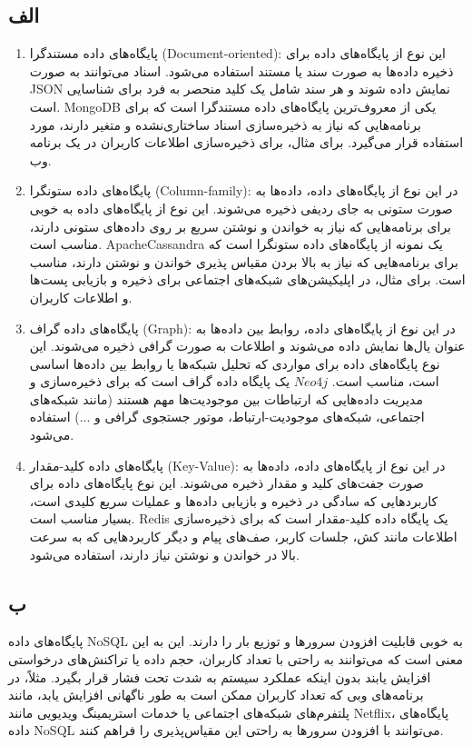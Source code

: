 \subsection*{الف}
\begin{enumerate}
	\item پایگاه‌های داده مستندگرا (Document-oriented):
	این نوع از پایگاه‌های داده برای ذخیره داده‌ها به صورت سند یا مستند استفاده می‌شود. اسناد می‌توانند به صورت JSON نمایش داده شوند و هر سند شامل یک کلید منحصر به فرد برای شناسایی است.
	MongoDB یکی از معروف‌ترین پایگاه‌های داده مستندگرا است که برای برنامه‌هایی که نیاز به ذخیره‌سازی اسناد ساختاری‌نشده و متغیر دارند، مورد استفاده قرار می‌گیرد. برای مثال، برای ذخیره‌سازی اطلاعات کاربران در یک برنامه وب.
	\item پایگاه‌های داده ستونگرا (Column-family):
	در این نوع از پایگاه‌های داده، داده‌ها به صورت ستونی به جای ردیفی ذخیره می‌شوند. این نوع از پایگاه‌های داده به خوبی برای برنامه‌هایی که نیاز به خواندن و نوشتن سریع بر روی داده‌های ستونی دارند، مناسب است. ApacheCassandra  یک نمونه از پایگاه‌های داده ستونگرا است که برای برنامه‌هایی که نیاز به بالا بردن مقیاس پذیری خواندن و نوشتن دارند، مناسب است. برای مثال، در اپلیکیشن‌های شبکه‌های اجتماعی برای ذخیره و بازیابی پست‌ها و اطلاعات کاربران.
	\item پایگاه‌های داده گراف (Graph):
	در این نوع از پایگاه‌های داده، روابط بین داده‌ها به عنوان یال‌ها نمایش داده می‌شوند و اطلاعات به صورت گرافی ذخیره می‌شوند. این نوع پایگاه‌های داده برای مواردی که تحلیل شبکه‌ها یا روابط بین داده‌ها اساسی است، مناسب است.
	$Neo4j$ یک پایگاه داده گراف است که برای ذخیره‌سازی و مدیریت داده‌هایی که ارتباطات بین موجودیت‌ها مهم هستند (مانند شبکه‌های اجتماعی، شبکه‌های موجودیت-ارتباط، موتور جستجوی گرافی و ...) استفاده می‌شود.
	\item پایگاه‌های داده کلید-مقدار (Key-Value):
	در این نوع از پایگاه‌های داده، داده‌ها به صورت جفت‌های کلید و مقدار ذخیره می‌شوند. این نوع پایگاه‌های داده برای کاربردهایی که سادگی در ذخیره و بازیابی داده‌ها و عملیات سریع کلیدی است، بسیار مناسب است.
	Redis یک پایگاه داده کلید-مقدار است که برای ذخیره‌سازی اطلاعات مانند کش، جلسات کاربر، صف‌های پیام و دیگر کاربردهایی که به سرعت بالا در خواندن و نوشتن نیاز دارند، استفاده می‌شود.
	
	
\end{enumerate}
\subsection*{ب}

پایگاه‌های داده NoSQL به خوبی قابلیت افزودن سرورها و توزیع بار را دارند. این به این معنی است که می‌توانند به راحتی با تعداد کاربران، حجم داده یا تراکنش‌های درخواستی افزایش یابند بدون اینکه عملکرد سیستم به شدت تحت فشار قرار بگیرد. مثلاً، در برنامه‌های وبی که تعداد کاربران ممکن است به طور ناگهانی افزایش یابد، مانند پلتفرم‌های شبکه‌های اجتماعی یا خدمات استریمینگ ویدیویی مانند Netflix، پایگاه‌های داده NoSQL می‌توانند با افزودن سرورها به راحتی این مقیاس‌پذیری را فراهم کنند.

